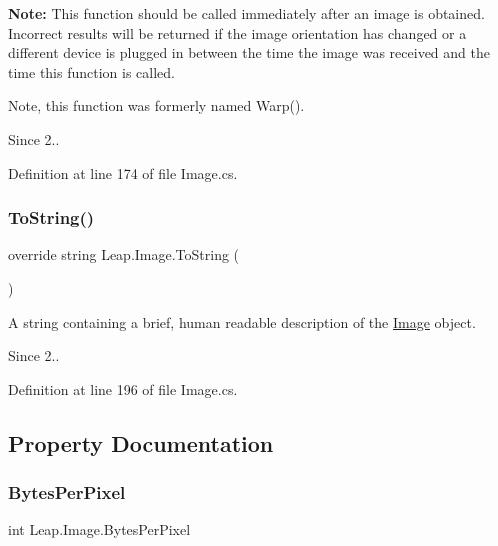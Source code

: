 {\bfseries{Note\+:}} This function should be called immediately after an image is obtained. Incorrect results will be returned if the image orientation has changed or a different device is plugged in between the time the image was received and the time this function is called.

Note, this function was formerly named Warp(). \begin{DoxySince}{Since}
2.. 
\end{DoxySince}


Definition at line 174 of file Image.\+cs.

\mbox{\label{class_leap_1_1_image_a0f052fc6d7936be1b055f5283756cc38}} 
\subsubsection{\texorpdfstring{ToString()}{ToString()}}
{\footnotesize\ttfamily override string Leap.\+Image.\+To\+String (\begin{DoxyParamCaption}{ }\end{DoxyParamCaption})}



A string containing a brief, human readable description of the \mbox{\hyperlink{class_leap_1_1_image}{Image}} object. 

\begin{DoxySince}{Since}
2.. 
\end{DoxySince}


Definition at line 196 of file Image.\+cs.



\subsection{Property Documentation}
\mbox{\label{class_leap_1_1_image_ae1866274238f8727fddcb387a6dc0ab0}} 
\subsubsection{\texorpdfstring{BytesPerPixel}{BytesPerPixel}}
{\footnotesize\ttfamily int Leap.\+Image.\+Bytes\+Per\+Pixel\hspace{0.3cm}{\ttfamily [get]}}



